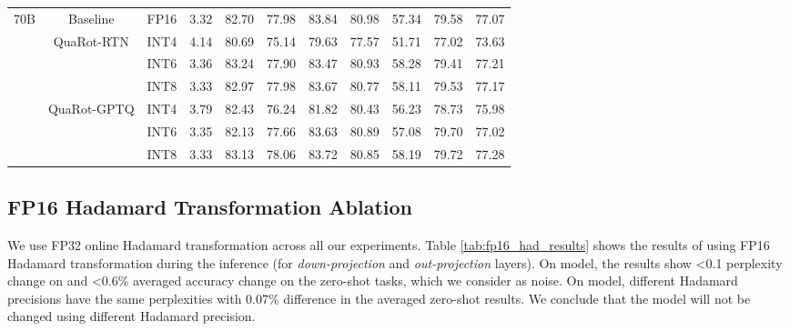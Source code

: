 \begin{table}[t]
{\begin{tabular}{|c|c|c|c|ccccccc|}
        \multirow{8}{*}{70B} & Baseline & FP16 & 3.32 & 82.70 & 77.98 & 83.84 & 80.98 & 57.34 & 79.58 & 77.07 \\
        \cmidrule{2-11}
        & \multirow{3}{*}{QuaRot-RTN}  & INT4 & 4.14  & 80.69 & 75.14 & 79.63 & 77.57 & 51.71 & 77.02 & 73.63 \\
         &   & INT6 & 3.36 & 83.24 & 77.90 & 83.47 & 80.93 & 58.28 & 79.41 & 77.21 \\
         &   & INT8 & 3.33 & 82.97 & 77.98 & 83.67 & 80.77 & 58.11 & 79.53 & 77.17 \\
         \cmidrule{2-11}
         & \multirow{3}{*}{QuaRot-GPTQ}  & INT4 &  3.79 &  82.43 & 76.24 & 81.82 & 80.43 & 56.23 & 78.73 & 75.98 \\
         &  & INT6 & 3.35 & 82.13  & 77.66  & 83.63 & 80.89 & 57.08  & 79.70  & 77.02 \\
         &   & INT8 & 3.33  & 83.13  & 78.06  & 83.72 & 80.85 & 58.19  & 79.72  & 77.28  \\
        \bottomrule
    \end{tabular}
    }
\label{tab:rtn_results_detailed}
\end{table}


\subsection{FP16 Hadamard Transformation Ablation}\label{sec:appx_had_fp16}

We use FP32 online Hadamard transformation across all our experiments.  Table \ref{tab:fp16_had_results} shows the results of using FP16 Hadamard transformation during the inference (for \textit{down-projection} and \textit{out-projection} layers). On \llamaSmall model, the results show <0.1 perplexity change on \wiki and <0.6\% averaged accuracy change on the zero-shot tasks, which we consider as noise. On \llamaMedium model, different Hadamard precisions have the same perplexities with 0.07\% difference in the averaged zero-shot results. We conclude that the model will not be changed using different Hadamard precision.


